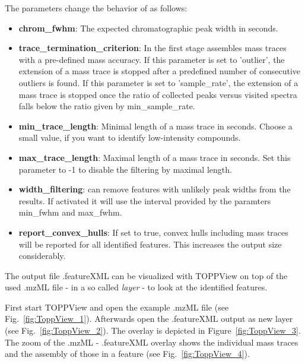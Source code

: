 The parameters change the behavior of  as follows:
\begin{itemize}
\item \textbf{chrom\_fwhm}: The expected chromatographic peak width in seconds.
\item \textbf{trace\_termination\_criterion}: In the first stage  assembles mass traces with a pre-defined mass accuracy. If this parameter is set to 'outlier', the extension of a mass trace is stopped after a predefined number of consecutive outliers is found. If this parameter is set to 'sample\_rate', the extension of a mass trace is stopped once the ratio of collected peaks versus visited spectra falls below the ratio given by min\_sample\_rate.
\item \textbf{min\_trace\_length}: Minimal length of a mass trace in seconds. Choose a small value, if you want to identify low-intensity compounds.
\item \textbf{max\_trace\_length}: Maximal length of a mass trace in seconds. Set this parameter to -1 to disable the filtering by maximal length.
\item \textbf{width\_filtering}:  can remove features with unlikely peak widths from the results. If activated it will use the interval provided by the paramters min\_fwhm and max\_fwhm.
\item \textbf{report\_convex\_hulls}: If set to true, convex hulls including mass traces will be reported for all identified features. This increases the output size considerably.
\end{itemize}

\noindent The output file .featureXML can be visualized with TOPPView on top of the used .mzML file - in a so called 	\textit{layer} - to look at the identified features.
\newline
 
\noindent First start TOPPView and open the example .mzML file (see Fig.~\ref{fig:ToppView_1}). Afterwards open the .featureXML output as new layer (see Fig.~\ref{fig:ToppView_2}). The overlay is depicted in Figure~\ref{fig:ToppView_3}. The zoom of the .mzML - .featureXML overlay shows the individual mass traces and the assembly of those in a feature (see Fig.~\ref{fig:ToppView_4}).

